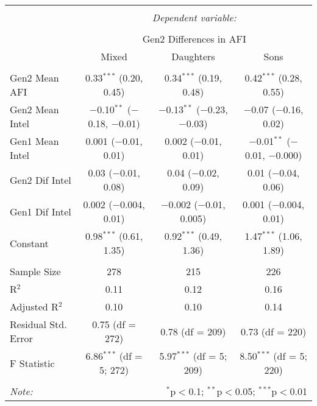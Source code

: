 
\begingroup 
\small 
\begin{tabular}{@{\extracolsep{1pt}}lccc} 
\\[-1.8ex]\hline 
\hline \\[-1.8ex] 
 & \multicolumn{3}{c}{\textit{Dependent variable:}} \\ 
\cline{2-4} 
\\[-1.8ex] & \multicolumn{3}{c}{Gen2 Differences in AFI} \\ 
 & Mixed & Daughters & Sons \\ 
\hline \\[-1.8ex] 
 Gen2 Mean AFI & 0.33$^{***}$ (0.20, 0.45) & 0.34$^{***}$ (0.19, 0.48) & 0.42$^{***}$ (0.28, 0.55) \\ 
  Gen2 Mean Intel & $-$0.10$^{**}$ ($-$0.18, $-$0.01) & $-$0.13$^{**}$ ($-$0.23, $-$0.03) & $-$0.07 ($-$0.16, 0.02) \\ 
  Gen1 Mean Intel & 0.001 ($-$0.01, 0.01) & 0.002 ($-$0.01, 0.01) & $-$0.01$^{**}$ ($-$0.01, $-$0.000) \\ 
  Gen2 Dif Intel & 0.03 ($-$0.01, 0.08) & 0.04 ($-$0.02, 0.09) & 0.01 ($-$0.04, 0.06) \\ 
  Gen1 Dif Intel & 0.002 ($-$0.004, 0.01) & $-$0.002 ($-$0.01, 0.005) & 0.001 ($-$0.004, 0.01) \\ 
  Constant & 0.98$^{***}$ (0.61, 1.35) & 0.92$^{***}$ (0.49, 1.36) & 1.47$^{***}$ (1.06, 1.89) \\ 
 \hline \\[-1.8ex] 
Sample Size & 278 & 215 & 226 \\ 
R$^{2}$ & 0.11 & 0.12 & 0.16 \\ 
Adjusted R$^{2}$ & 0.10 & 0.10 & 0.14 \\ 
Residual Std. Error & 0.75 (df = 272) & 0.78 (df = 209) & 0.73 (df = 220) \\ 
F Statistic & 6.86$^{***}$ (df = 5; 272) & 5.97$^{***}$ (df = 5; 209) & 8.50$^{***}$ (df = 5; 220) \\ 
\hline 
\hline \\[-1.8ex] 
\textit{Note:}  & \multicolumn{3}{r}{$^{*}$p$<$0.1; $^{**}$p$<$0.05; $^{***}$p$<$0.01} \\ 
\end{tabular} 
\endgroup 
